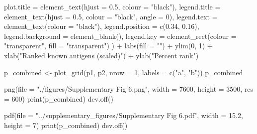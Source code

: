 \documentclass[
  11pt,
  oneside]{book}
\newenvironment{Shaded}{\begin{snugshade}}{\end{snugshade}}
\newcommand{\AttributeTok}[1]{\textcolor[rgb]{0.77,0.63,0.00}{#1}}
\newcommand{\DecValTok}[1]{\textcolor[rgb]{0.00,0.00,0.81}{#1}}
\newcommand{\FloatTok}[1]{\textcolor[rgb]{0.00,0.00,0.81}{#1}}
\newcommand{\FunctionTok}[1]{\textcolor[rgb]{0.00,0.00,0.00}{#1}}
\newcommand{\NormalTok}[1]{#1}
\newcommand{\OtherTok}[1]{\textcolor[rgb]{0.56,0.35,0.01}{#1}}
\newcommand{\SpecialCharTok}[1]{\textcolor[rgb]{0.00,0.00,0.00}{#1}}
\newcommand{\StringTok}[1]{\textcolor[rgb]{0.31,0.60,0.02}{#1}}
\begin{document}
\begin{Shaded}
\begin{Highlighting}[]
    \AttributeTok{plot.title =} \FunctionTok{element\_text}\NormalTok{(}\AttributeTok{hjust =} \FloatTok{0.5}\NormalTok{, }\AttributeTok{colour =} \StringTok{"black"}\NormalTok{),}
    \AttributeTok{legend.title =} \FunctionTok{element\_text}\NormalTok{(}\AttributeTok{hjust =} \FloatTok{0.5}\NormalTok{, }\AttributeTok{colour =} \StringTok{"black"}\NormalTok{, }\AttributeTok{angle =} \DecValTok{0}\NormalTok{),}
    \AttributeTok{legend.text =} \FunctionTok{element\_text}\NormalTok{(}\AttributeTok{colour =} \StringTok{"black"}\NormalTok{),}
    \AttributeTok{legend.position =} \FunctionTok{c}\NormalTok{(}\FloatTok{0.34}\NormalTok{, }\FloatTok{0.16}\NormalTok{),}
    \AttributeTok{legend.background =} \FunctionTok{element\_blank}\NormalTok{(),}
    \AttributeTok{legend.key =} \FunctionTok{element\_rect}\NormalTok{(}\AttributeTok{colour =} \StringTok{"transparent"}\NormalTok{, }\AttributeTok{fill =} \StringTok{"transparent"}\NormalTok{)}
\NormalTok{  ) }\SpecialCharTok{+}
  \FunctionTok{labs}\NormalTok{(}\AttributeTok{fill =} \StringTok{""}\NormalTok{) }\SpecialCharTok{+}
  \FunctionTok{ylim}\NormalTok{(}\DecValTok{0}\NormalTok{, }\DecValTok{1}\NormalTok{) }\SpecialCharTok{+}
  \FunctionTok{xlab}\NormalTok{(}\StringTok{"Ranked known antigens (scaled)"}\NormalTok{) }\SpecialCharTok{+}
  \FunctionTok{ylab}\NormalTok{(}\StringTok{"Percent rank"}\NormalTok{)}
\end{Highlighting}
\end{Shaded}

\begin{Shaded}
\begin{Highlighting}[]
\NormalTok{p\_combined }\OtherTok{\textless{}{-}} \FunctionTok{plot\_grid}\NormalTok{(p1, p2, }\AttributeTok{nrow =} \DecValTok{1}\NormalTok{, }\AttributeTok{labels =} \FunctionTok{c}\NormalTok{(}\StringTok{"a"}\NormalTok{, }\StringTok{"b"}\NormalTok{))}
\NormalTok{p\_combined}
\end{Highlighting}
\end{Shaded}

\begin{Shaded}
\begin{Highlighting}[]
\FunctionTok{png}\NormalTok{(}\AttributeTok{file =} \StringTok{"./figures/Supplementary Fig 6.png"}\NormalTok{, }\AttributeTok{width =} \DecValTok{7600}\NormalTok{, }\AttributeTok{height =} \DecValTok{3500}\NormalTok{, }\AttributeTok{res =} \DecValTok{600}\NormalTok{)}
\FunctionTok{print}\NormalTok{(p\_combined)}
\FunctionTok{dev.off}\NormalTok{()}

\FunctionTok{pdf}\NormalTok{(}\AttributeTok{file =} \StringTok{"../supplementary\_figures/Supplementary Fig 6.pdf"}\NormalTok{, }\AttributeTok{width =} \FloatTok{15.2}\NormalTok{, }\AttributeTok{height =} \DecValTok{7}\NormalTok{)}
\FunctionTok{print}\NormalTok{(p\_combined)}
\FunctionTok{dev.off}\NormalTok{()}
\end{Highlighting}
\end{Shaded}
\end{document}
